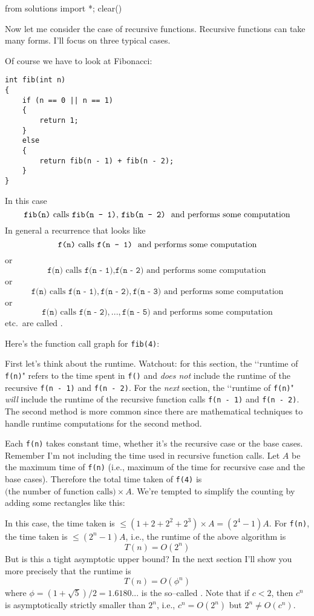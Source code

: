 \begin{python0}
from solutions import *; clear()
\end{python0}

Now let me consider the case of recursive functions.
Recursive functions can take many forms.
I'll focus on three typical cases.

Of course we have to look at Fibonacci:
\begin{Verbatim}[frame=single,fontsize=\footnotesize]
int fib(int n)
{
    if (n == 0 || n == 1)
    {
        return 1;
    }
    else
    {
        return fib(n - 1) + fib(n - 2);
    }
}
\end{Verbatim}
In this case
\[
\texttt{fib(n)} \text{ calls \texttt{fib(n - 1)}, \texttt{fib(n - 2)} \text{ and performs some computation}} 
\]
In general a recurrence that looks like
\[
\texttt{f(n)} \text{ calls \texttt{f(n - 1)} \text{ and performs some computation}} 
\]
or
\[
\texttt{f(n)} \text{ calls } \texttt{f(n - 1)}, \texttt{f(n - 2)} \text{ and performs some computation} 
\]
or
\[
\texttt{f(n)} \text{ calls } \texttt{f(n - 1)}, \texttt{f(n - 2)}, \texttt{f(n - 3)} \text{ and performs some computation} 
\]
or
\[
\texttt{f(n)} \text{ calls } \texttt{f(n - 2)}, ... , \texttt{f(n - 5)} \text{ and performs some computation} 
\]
etc.~are called .

Here's the function call graph for \verb!fib(4)!:

First let's think about the runtime.
Watchout:
for this section, the \lq\lq runtime of \verb!f(n)!"
refers to the time spent in \verb!f()! and \textit{does not} include
the runtime of the recursive 
\verb!f(n - 1)! and \verb!f(n - 2)!.
For the \textit{next} section,
the \lq\lq runtime of \verb!f(n)!" \textit{will} include
the runtime of the recursive function calls
\verb!f(n - 1)! and \verb!f(n - 2)!.
The second method is more common since there are mathematical techniques
to handle runtime computations for the second method.

Each \verb!f(n)! takes constant time, whether it's the
recursive case or the base cases.
Remember I'm not including the time used in recursive function calls.
Let $A$ be the maximum time of \verb!f(n)!
(i.e., maximum of the time for recursive case and the base cases).
Therefore the total time taken of \verb!f(4)! is
$\text{(the number of function calls)} \times A$.
We're tempted to simplify the counting by adding some rectangles
like this:

In this case, the time taken is $\leq (1 + 2 + 2^2 + 2^3) \times A = (2^4 - 1)A$.
For \verb!f(n)!, the time taken is $\leq (2^n - 1)A$, i.e.,
the runtime of the above algorithm is
\[
T(n) = O(2^n)
\]
But is this a tight asymptotic upper bound?
In the next section I'll show you more precisely that the runtime is
\[
T(n) = O(\phi^n)
\]
where $\phi = (1 + \sqrt{5})/2 = 1.6180...$ is the so--called
.
Note that if $c < 2$, then $c^n$ is asymptotically strictly smaller than $2^n$,
i.e., $c^n = O(2^n)$ but $2^n \neq O(c^n)$.

